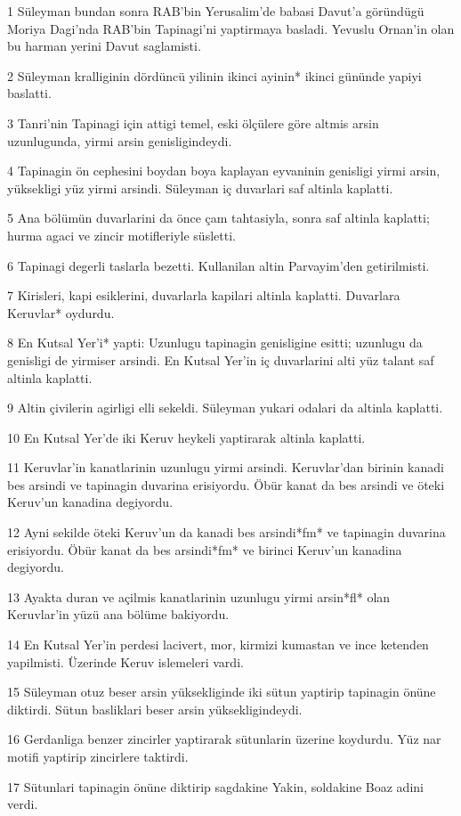 \par 1 Süleyman bundan sonra RAB'bin Yerusalim'de babasi Davut'a göründügü Moriya Dagi'nda RAB'bin Tapinagi'ni yaptirmaya basladi. Yevuslu Ornan'in olan bu harman yerini Davut saglamisti.
\par 2 Süleyman kralliginin dördüncü yilinin ikinci ayinin* ikinci gününde yapiyi baslatti.
\par 3 Tanri'nin Tapinagi için attigi temel, eski ölçülere göre altmis arsin uzunlugunda, yirmi arsin genisligindeydi.
\par 4 Tapinagin ön cephesini boydan boya kaplayan eyvaninin genisligi yirmi arsin, yüksekligi yüz yirmi arsindi. Süleyman iç duvarlari saf altinla kaplatti.
\par 5 Ana bölümün duvarlarini da önce çam tahtasiyla, sonra saf altinla kaplatti; hurma agaci ve zincir motifleriyle süsletti.
\par 6 Tapinagi degerli taslarla bezetti. Kullanilan altin Parvayim'den getirilmisti.
\par 7 Kirisleri, kapi esiklerini, duvarlarla kapilari altinla kaplatti. Duvarlara Keruvlar* oydurdu.
\par 8 En Kutsal Yer'i* yapti: Uzunlugu tapinagin genisligine esitti; uzunlugu da genisligi de yirmiser arsindi. En Kutsal Yer'in iç duvarlarini alti yüz talant saf altinla kaplatti.
\par 9 Altin çivilerin agirligi elli sekeldi. Süleyman yukari odalari da altinla kaplatti.
\par 10 En Kutsal Yer'de iki Keruv heykeli yaptirarak altinla kaplatti.
\par 11 Keruvlar'in kanatlarinin uzunlugu yirmi arsindi. Keruvlar'dan birinin kanadi bes arsindi ve tapinagin duvarina erisiyordu. Öbür kanat da bes arsindi ve öteki Keruv'un kanadina degiyordu.
\par 12 Ayni sekilde öteki Keruv'un da kanadi bes arsindi*fm* ve tapinagin duvarina erisiyordu. Öbür kanat da bes arsindi*fm* ve birinci Keruv'un kanadina degiyordu.
\par 13 Ayakta duran ve açilmis kanatlarinin uzunlugu yirmi arsin*fl* olan Keruvlar'in yüzü ana bölüme bakiyordu.
\par 14 En Kutsal Yer'in perdesi lacivert, mor, kirmizi kumastan ve ince ketenden yapilmisti. Üzerinde Keruv islemeleri vardi.
\par 15 Süleyman otuz beser arsin yüksekliginde iki sütun yaptirip tapinagin önüne diktirdi. Sütun basliklari beser arsin yüksekligindeydi.
\par 16 Gerdanliga benzer zincirler yaptirarak sütunlarin üzerine koydurdu. Yüz nar motifi yaptirip zincirlere taktirdi.
\par 17 Sütunlari tapinagin önüne diktirip sagdakine Yakin, soldakine Boaz adini verdi.

